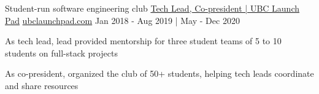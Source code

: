 \begin{cventries}

  \cventry
    {Student-run software engineering club} %
    {\href{https://bobheadxi.dev/what-is-launch-pad/}{ Tech Lead, Co-president | UBC Launch Pad}} %
    {\href{https://ubclaunchpad.com}{ubclaunchpad.com}} %
    {
        Jan 2018 - Aug 2019
        | May - Dec 2020
    } %
    {
      \begin{cvitems} %
        \item {As tech lead, lead provided mentorship for three student teams of 5 to 10 students on full-stack projects}
        \item {As co-president, organized the club of 50+ students, helping tech leads coordinate and share resources}
      \end{cvitems}
    }

\iffalse
  \cventry
    {the organization behind western Canada's largest hackathon, nwHacks} %
    {nwPlus | Web Developer} %
    {\linktext{2019.nwhacks.io}} %
    {May 2018 - Sept 2018} %
    {
      \begin{cvitems} %
        \item {Implemented the nwHacks 2019 website and applicant management system used by 1000+ users}
      \end{cvitems}
    }
\fi


\end{cventries}

